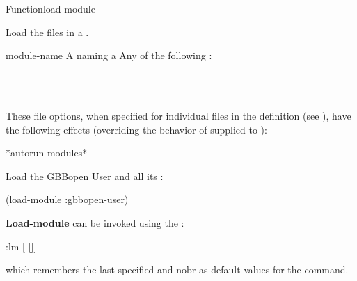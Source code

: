 \documentclass[10pt,twoside,english,pdftex]{article}
\begin{document}

\begin{functiondoc}{Function}{load-module}{
     }
%
% 

\fnsyntax 

\fnpurpose Load the files in a .

\fnpackage {}

\fnmodule {}

\fnargs
\begin{args}{module-name}
 A  naming a 
\arg[option] Any of the following : 
\loadmoduleoptions
\end{args}

\fnerrors 
\modulenotdefined\\
\relativedircircularity\\
\patchesonlymodulenotloaded

\fndescription These file options, when specified for individual files in the
 definition (see ),
have the following effects (overriding the behavior of 
supplied to ):
%
\W\supp\tabletop
\loadmodulefileoptions

\begin{alsos}{*autorun-modules*}
\end{alsos}

\fnexample 
%
Load the GBBopen User  and all its :
%
\W\supp
\begin{example}
  (load-module :gbbopen-user)
\end{example}

\replnote \textbf{Load-module} can be invoked using the :
%
%
%
\W\supp
\begin{example}
  :lm \textrm{[} \textrm{[}\superstar\textrm{]]}
\end{example}
%
which remembers the last specified  and
nobr{} as default values for the command.

\end{functiondoc}
\end{document}
